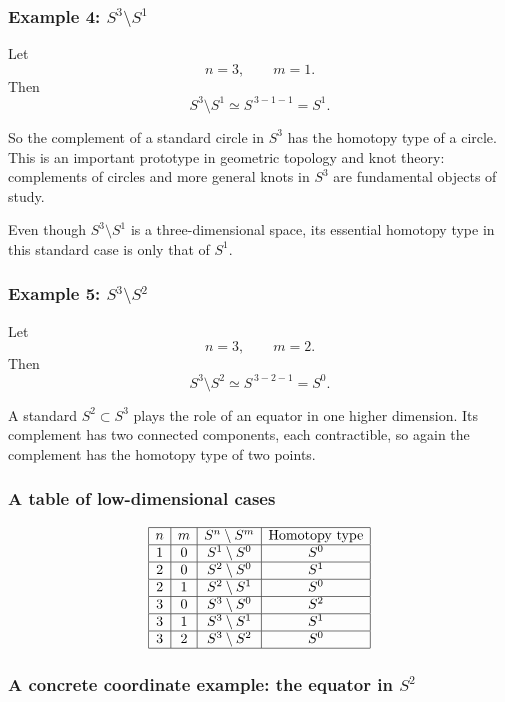 \documentclass[12pt,a4paper]{article}
\theoremstyle{notespace}
\begin{document}
\subsubsection{Example 4: \(S^3\setminus S^1\)}

Let
\[
n=3,
\qquad
m=1.
\]
Then
\[
S^3\setminus S^1 \simeq S^{\,3-1-1}=S^1.
\]

So the complement of a standard circle in \(S^3\) has the homotopy type of a circle. This is an important prototype in geometric topology and knot theory: complements of circles and more general knots in \(S^3\) are fundamental objects of study.

Even though \(S^3\setminus S^1\) is a three-dimensional space, its essential homotopy type in this standard case is only that of \(S^1\).

\subsubsection{Example 5: \(S^3\setminus S^2\)}

Let
\[
n=3,
\qquad
m=2.
\]
Then
\[
S^3\setminus S^2 \simeq S^{\,3-2-1}=S^0.
\]

A standard \(S^2\subset S^3\) plays the role of an equator in one higher dimension. Its complement has two connected components, each contractible, so again the complement has the homotopy type of two points.

\subsubsection{A table of low-dimensional cases}

\[
\begin{array}{|c|c|c|c|}
	\hline
	n & m & S^n\setminus S^m & \text{Homotopy type} \\
	\hline
	1 & 0 & S^1\setminus S^0 & S^0 \\
	\hline
	2 & 0 & S^2\setminus S^0 & S^1 \\
	\hline
	2 & 1 & S^2\setminus S^1 & S^0 \\
	\hline
	3 & 0 & S^3\setminus S^0 & S^2 \\
	\hline
	3 & 1 & S^3\setminus S^1 & S^1 \\
	\hline
	3 & 2 & S^3\setminus S^2 & S^0 \\
	\hline
\end{array}
\]

\subsubsection{A concrete coordinate example: the equator in \(S^2\)}
\end{document}
